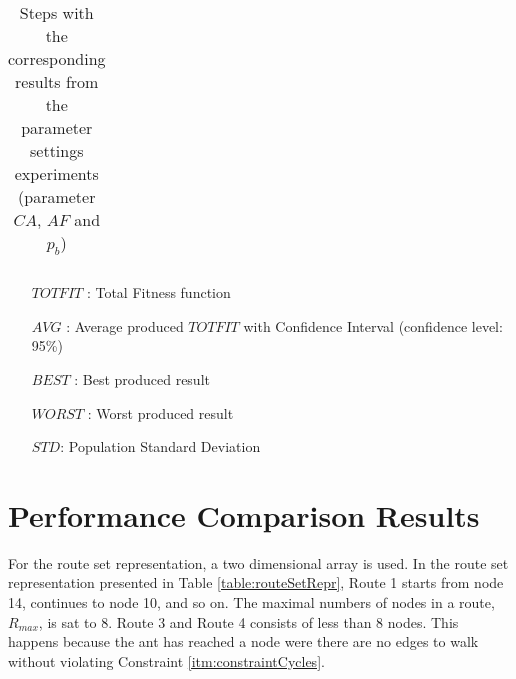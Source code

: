 \begin{table}
\begin{tabular}{|l|l|l|c||c|c|c|c|c|}
    \hline
    \end{tabular}
    \caption {Steps with the corresponding results from the parameter settings experiments (parameter $CA$, $AF$ and $p_b$)}
    \tiny
    \begin{itemize}[noitemsep]
    \item[$TOTFIT$ :] Total Fitness function
    \item[$AVG$ :] Average produced $TOTFIT$ with Confidence Interval (confidence level: 95\%)
    \item[$BEST$ :] Best produced result
    \item[$WORST$ :] Worst produced result
    \item[$STD$:] Population Standard Deviation 
    \end{itemize}
    \label{table:pm2}
\end{table}


\section{Performance Comparison Results}
\label{sec:performanceComparisonAppendix}

For the route set representation, a two dimensional array is used. In the route set representation presented in Table \vref{table:routeSetRepr}, Route 1 starts from node 14, continues to node 10, and so on. The maximal numbers of nodes in a route, $R_{max}$, is sat to 8. Route 3 and Route 4 consists of less than 8 nodes. This happens because the ant has reached a node were there are no edges to walk without violating Constraint \vref{itm:constraintCycles}.

